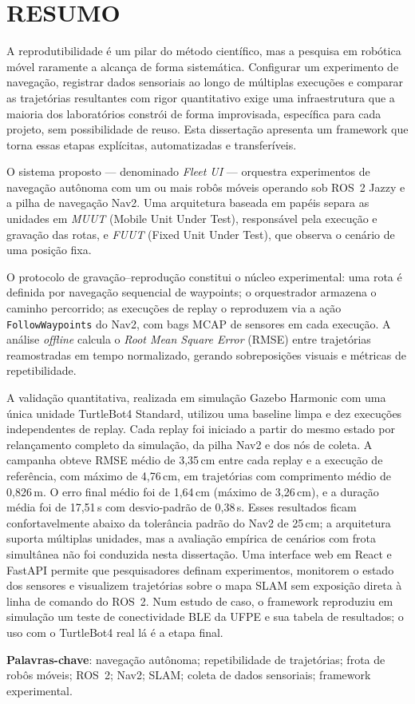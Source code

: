 \chapter*{RESUMO}

A reprodutibilidade é um pilar do método científico, mas a pesquisa em robótica móvel
raramente a alcança de forma sistemática. Configurar um experimento de navegação,
registrar dados sensoriais ao longo de múltiplas execuções e comparar as trajetórias
resultantes com rigor quantitativo exige uma infraestrutura que a maioria dos laboratórios
constrói de forma improvisada, específica para cada projeto, sem possibilidade de reuso.
Esta dissertação apresenta um framework que torna essas etapas explícitas, automatizadas
e transferíveis.

O sistema proposto --- denominado \textit{Fleet UI} --- orquestra experimentos de navegação
autônoma com um ou mais robôs móveis operando sob ROS~2 Jazzy e a pilha de navegação Nav2.
Uma arquitetura baseada em papéis separa as unidades em \textit{MUUT} (Mobile Unit Under
Test), responsável pela execução e gravação das rotas, e \textit{FUUT} (Fixed Unit Under
Test), que observa o cenário de uma posição fixa.

O protocolo de gravação--reprodução constitui o núcleo experimental: uma rota é definida
por navegação sequencial de waypoints; o orquestrador armazena o caminho percorrido; as
execuções de replay o reproduzem via a ação \texttt{FollowWaypoints} do Nav2, com bags
MCAP de sensores em cada execução. A análise \textit{offline} calcula o
\textit{Root Mean Square Error} (RMSE) entre trajetórias reamostradas em tempo
normalizado, gerando sobreposições visuais e métricas de repetibilidade.

A validação quantitativa, realizada em simulação Gazebo Harmonic com uma única
unidade TurtleBot4 Standard, utilizou uma baseline limpa e dez execuções independentes
de replay. Cada replay foi iniciado a partir do mesmo estado por relançamento completo
da simulação, da pilha Nav2 e dos nós de coleta. A campanha obteve RMSE
médio de 3,35\,cm entre cada replay e a execução de referência, com máximo de
4,76\,cm, em trajetórias com comprimento médio de 0,826\,m. O erro final médio foi de
1,64\,cm (máximo de 3,26\,cm), e a duração média foi de 17,51\,s com desvio-padrão de
0,38\,s. Esses resultados ficam confortavelmente abaixo da tolerância padrão do Nav2 de
25\,cm; a arquitetura suporta múltiplas unidades, mas a avaliação empírica de cenários
com frota simultânea não foi conduzida nesta dissertação. Uma interface web em React e
FastAPI permite que pesquisadores definam experimentos, monitorem o estado dos sensores
e visualizem trajetórias sobre o mapa SLAM sem exposição direta à linha de comando do
ROS~2. Num estudo de caso, o framework reproduziu em simulação um teste de
conectividade BLE da UFPE e sua tabela de resultados; o uso com o TurtleBot4 real lá
é a etapa final.

\vspace{0.5cm}
\noindent\textbf{Palavras-chave}: navegação autônoma; repetibilidade de trajetórias;
frota de robôs móveis; ROS~2; Nav2; SLAM; coleta de dados sensoriais; framework experimental.

